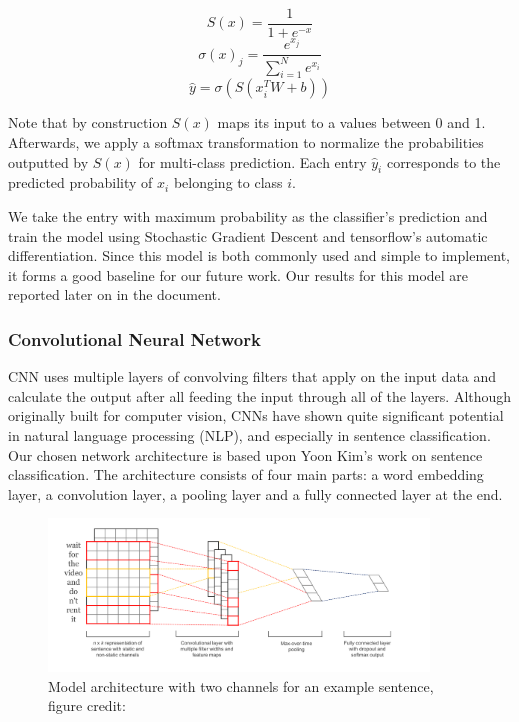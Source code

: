 \documentclass[conference]{IEEEtran}
\begin{document}
    $$S(x) = \frac{1}{1+e^{-x}}$$
    $$ \sigma (x)_{j}={\frac {e^{x_{j}}}{\sum _{i=1}^{N}e^{x_{i}}}}$$
    $$\hat{y} = \sigma(S(x^T_i W +b))$$

    
    Note that by construction $S(x)$ maps its input to a values between 0 and 1.
    Afterwards, we apply a softmax transformation to normalize the probabilities outputted
    by $S(x)$ for multi-class prediction. Each entry $\hat{y}_i$ corresponds to the predicted
    probability of $x_i$ belonging to class $i$.
    
    We take the entry with maximum probability as the classifier's prediction and train the model using
    Stochastic Gradient Descent and tensorflow's automatic differentiation. Since this model is both
    commonly used and simple to implement, it forms a good baseline for our future work. Our results
    for this model are reported later on in the document.

\subsubsection{Convolutional Neural Network}
\label{model:core:cnn}
    CNN uses multiple layers of convolving filters that apply on the input data and
    calculate the output after all feeding the input through all of the layers. Although
    originally built for computer vision, CNNs have shown quite significant potential in
    natural language processing (NLP), and especially in sentence classification.
    Our chosen network architecture is based upon Yoon Kim's work on sentence
    classification\cite{kim2014convolutional}. The architecture consists of four 
    main parts: a word
    embedding layer, a convolution layer, a pooling layer and a fully connected layer
    at the end.
    \begin{figure}
    \center\includegraphics[width=0.9\textwidth]{figure/sc_model}
    \caption{Model architecture with two channels for an example sentence,
     figure credit: \cite{kim2014convolutional}}
    \end{figure}
\end{document}
